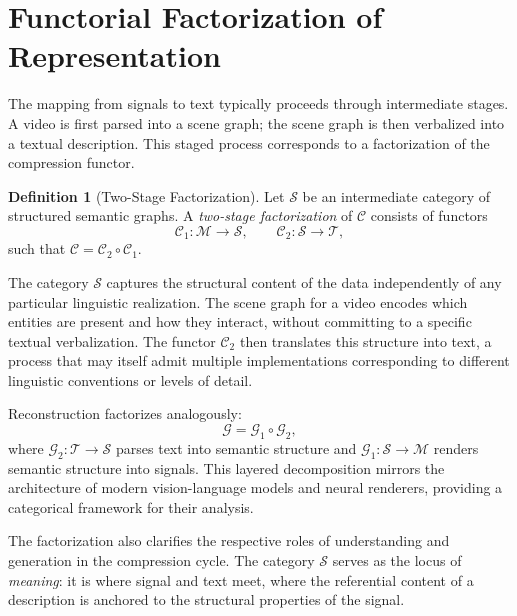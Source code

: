 \documentclass[12pt,a4paper]{article}
\theoremstyle{definition}
\newtheorem{definition}[theorem]{Definition}
\theoremstyle{remark}
\begin{document}
\section{Functorial Factorization of Representation}
\label{sec:factorization}

The mapping from signals to text typically proceeds through intermediate stages. A video is first parsed into a scene graph; the scene graph is then verbalized into a textual description. This staged process corresponds to a factorization of the compression functor.

\begin{definition}[Two-Stage Factorization]
Let $\mathcal{S}$ be an intermediate category of structured semantic graphs. A \emph{two-stage factorization} of $\mathcal{C}$ consists of functors
\[
\mathcal{C}_1 : \mathcal{M} \rightarrow \mathcal{S}, \qquad \mathcal{C}_2 : \mathcal{S} \rightarrow \mathcal{T},
\]
such that $\mathcal{C} = \mathcal{C}_2 \circ \mathcal{C}_1$.
\end{definition}

The category $\mathcal{S}$ captures the structural content of the data independently of any particular linguistic realization. The scene graph for a video encodes which entities are present and how they interact, without committing to a specific textual verbalization. The functor $\mathcal{C}_2$ then translates this structure into text, a process that may itself admit multiple implementations corresponding to different linguistic conventions or levels of detail.

Reconstruction factorizes analogously:
\[
\mathcal{G} = \mathcal{G}_1 \circ \mathcal{G}_2,
\]
where $\mathcal{G}_2 : \mathcal{T} \rightarrow \mathcal{S}$ parses text into semantic structure and $\mathcal{G}_1 : \mathcal{S} \rightarrow \mathcal{M}$ renders semantic structure into signals. This layered decomposition mirrors the architecture of modern vision-language models and neural renderers, providing a categorical framework for their analysis.

The factorization also clarifies the respective roles of understanding and generation in the compression cycle. The category $\mathcal{S}$ serves as the locus of \emph{meaning}: it is where signal and text meet, where the referential content of a description is anchored to the structural properties of the signal.

\end{document}
